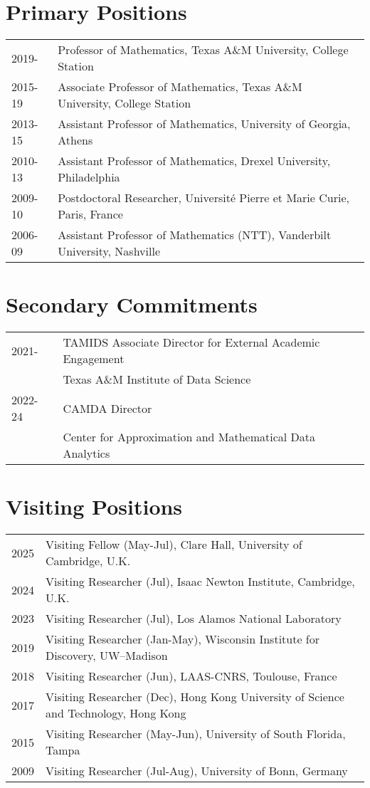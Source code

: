 \documentclass[11pt]{article}
\begin{document}
\section{Primary Positions}
\begin{tabular}{ll}

2019- & Professor of Mathematics, Texas A\&M University, College Station\\
2015-19 & Associate Professor of Mathematics, Texas A\&M University, College Station\\
2013-15 & Assistant Professor of Mathematics, University of Georgia, Athens\\
2010-13 & Assistant Professor of Mathematics,  Drexel University, Philadelphia\\
2009-10 & Postdoctoral Researcher,  Universit\'{e} Pierre et Marie Curie, Paris, France\\
2006-09 & Assistant Professor of Mathematics (NTT),  Vanderbilt University, Nashville
\end{tabular}


\section{Secondary Commitments} %
\begin{tabular}{ll}
2021- \; \, & TAMIDS Associate Director for External Academic Engagement\\
& \quad Texas A\&M Institute of Data Science\\
2022- 24 & CAMDA Director\\
& \quad Center for Approximation and Mathematical Data Analytics
\end{tabular}


\section{Visiting Positions}
\begin{tabular}{ll}
2025 & Visiting Fellow (May-Jul), Clare Hall, University of Cambridge, U.K.\\ 
2024 & Visiting Researcher (Jul), Isaac Newton Institute, Cambridge, U.K.\\
2023 & Visiting Researcher (Jul), Los Alamos National Laboratory\\
2019 & Visiting Researcher (Jan-May), Wisconsin Institute for Discovery, UW--Madison\\ 
2018 & Visiting Researcher (Jun), LAAS-CNRS, Toulouse, France\\
2017 & Visiting Researcher (Dec), Hong Kong University of Science and Technology, Hong Kong\\
2015 & Visiting Researcher (May-Jun), University of South Florida, Tampa\\
2009 & Visiting Researcher (Jul-Aug), University of Bonn, Germany
\end{tabular}
 
\end{document}
